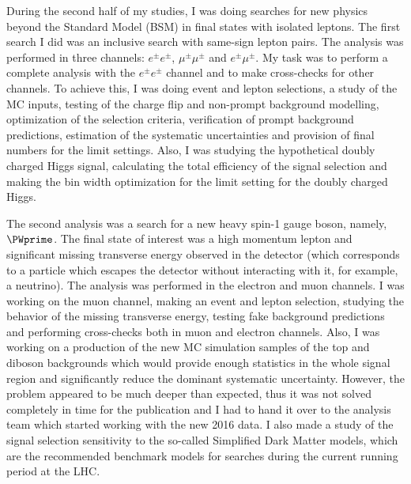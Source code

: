 \begin{preface}
During the second half of my studies, I was doing searches for new physics beyond the Standard Model (BSM) in final states with isolated leptons. The first search I did was an inclusive search with same-sign lepton pairs. The analysis was performed in three channels: $e^{\pm}e^{\pm}$, $\mu^{\pm}\mu^{\pm}$ and $e^{\pm}\mu^{\pm}$. My task was to perform a complete analysis with the $e^{\pm}e^{\pm}$ channel and to make cross-checks for other channels. To achieve this, I was doing event and lepton selections, a study of the MC inputs, testing of the charge flip and non-prompt background modelling, optimization of the selection criteria, verification of prompt background predictions, estimation of the systematic uncertainties and provision of final numbers for the limit settings. Also, I was studying the hypothetical doubly charged Higgs signal, calculating the total efficiency of the signal selection and making the bin width optimization for the limit setting for the doubly charged Higgs.

The second analysis was a search for a new heavy spin-1 gauge boson, namely, $\PWprime$. The final state of interest was a high momentum lepton and significant missing transverse energy observed in the detector (which corresponds to a particle which escapes the detector without interacting with it, for example, a neutrino). The analysis was performed in the electron and muon channels.
I was working on the muon channel, making an event and lepton selection, studying the behavior of the missing transverse energy, testing fake background predictions and performing cross-checks both in muon and electron channels. Also, I was working on a production of the new MC simulation samples of the top and diboson backgrounds which would provide enough statistics in the whole signal region and significantly reduce the dominant systematic uncertainty. However, the problem appeared to be much deeper than expected, thus it was not solved completely in time for the publication and I had to hand it over to the analysis team which started working with the new 2016 data.
I also made a study of the signal selection sensitivity to the so-called Simplified Dark Matter models, which are the recommended 
benchmark models for searches during the current running period at the LHC.


\end{preface}
